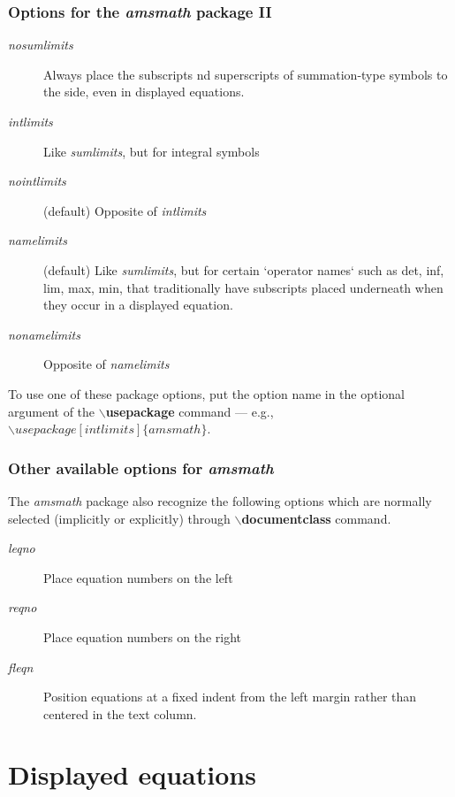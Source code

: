 \documentclass[12pt]{beamer}
\begin{document}
  \begin{frame}
    \frametitle{ Options for the \emph{amsmath} package II}
    \begin{description}
      \item[\emph{nosumlimits}] Always place the subscripts nd superscripts of summation-type symbols to the side, even in displayed equations.
      \item[\emph{intlimits}] Like \emph{sumlimits}, but for integral symbols
      \item[\emph{nointlimits}] (default) Opposite of \emph{intlimits}
      \item[\emph{namelimits}] (default) Like \emph{sumlimits}, but for certain `operator names` such as det, inf, lim, max, min, that traditionally have subscripts placed underneath when they occur in a displayed equation.
      \item[\emph{nonamelimits}] Opposite of \emph{namelimits}
    \end{description}
    To use one of these package options, put the option name in the optional argument of the $\backslash$\textbf{usepackage} command --- e.g., $\backslash usepackage [ intlimits ] \{ amsmath \}$.
  \end{frame}
  \begin{frame}
    \frametitle{Other available options for \emph{amsmath}}
    The \emph{amsmath} package also recognize the following options which are normally selected (implicitly or explicitly) through $\backslash$\textbf{documentclass} command.
    \begin{description}
      \item[\emph{leqno}] Place equation numbers on the left
      \item[\emph{reqno}] Place equation numbers on the right
      \item[\emph{fleqn}] Position equations at a fixed indent from the left margin rather than centered in the text column.
    \end{description}
  \end{frame}

  \section{Displayed equations}
\end{document}
